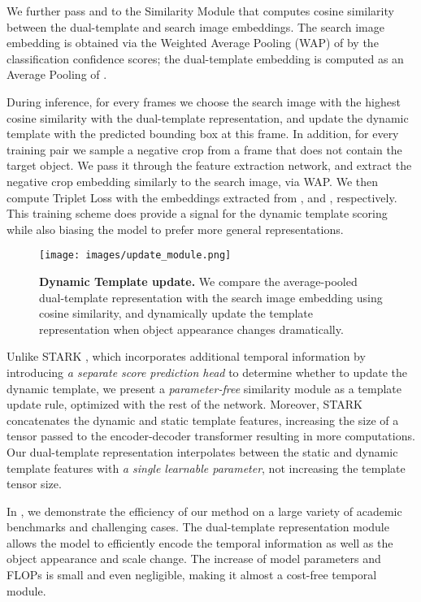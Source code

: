 \documentclass[runningheads]{llncs}
\begin{document}
We further pass  and  to the Similarity Module that computes cosine similarity between the dual-template and search image embeddings. 
The search image embedding  is obtained via the Weighted Average Pooling (WAP) \cite{WAP} of  by the classification confidence scores; the dual-template embedding  is computed as an Average Pooling \cite{AvgPool} of .

During inference, for every  frames we choose the search image with the highest cosine similarity with the dual-template representation, and update the dynamic template with the predicted bounding box at this frame. 
In addition, for every training pair we sample a negative crop  from a frame that does not contain the target object. 
We pass it through the feature extraction network, and extract the negative crop embedding  similarly to the search image, via WAP.
We then compute Triplet Loss \cite{TripletLoss} with the embeddings  extracted from ,  and , respectively. 
This training scheme does provide a signal for the dynamic template scoring while also biasing the model to prefer more general representations.


\begin{figure}[t]\centering
  \texttt{[image: images/update\_module.png]}
\caption{\textbf{Dynamic Template update.} We compare the average-pooled dual-template representation with the search image embedding using cosine similarity, and dynamically update the template representation when object appearance changes dramatically.}
\label{fig:update}
\end{figure}

Unlike STARK \cite{STARK}, which incorporates additional temporal information by introducing \textit{a separate score prediction head} to determine whether to update the dynamic template, we present a \textit{parameter-free} similarity module as a template update rule, optimized with the rest of the network.
Moreover, STARK concatenates the dynamic and static template features, increasing the size of a tensor passed to the encoder-decoder transformer resulting in more computations.
Our dual-template representation interpolates between the static and dynamic template features with \textit{a single learnable parameter}, not increasing the template tensor size.

In , we demonstrate the efficiency of our method on a large variety of academic benchmarks and challenging cases. 
The dual-template representation module allows the model to efficiently encode the temporal information as well as the object appearance and scale change. The increase of model parameters and FLOPs is small and even negligible, making it almost a cost-free temporal module.
\end{document}
